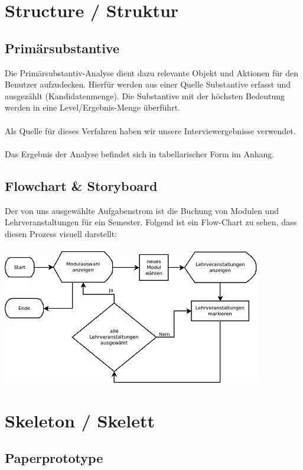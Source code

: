 \documentclass{article}
\begin{document}
\newpage

\section{Structure / Struktur}

\subsection{Primärsubstantive}

Die Primärsubstantiv-Analyse dient dazu relevante Objekt und Aktionen für den Benutzer aufzudecken. Hierfür werden aus einer Quelle Substantive erfasst und ausgezählt (Kandidatenmenge). Die Substantive mit der höchsten Bedeutung werden in eine Level/Ergebnis-Menge überführt.\\
\\
Als Quelle für dieses Verfahren haben wir unsere Interviewergebnisse verwendet.\\
\\
Das Ergebnis der Analyse befindet sich in tabellarischer Form im Anhang.

\subsection{Flowchart \& Storyboard}

Der von uns ausgewählte Aufgabenstrom ist die Buchung von Modulen und Lehrveranstaltungen für ein Semester. Folgend ist ein Flow-Chart zu sehen, dass diesen Prozess visuell darstellt:\\
\\
\includegraphics{img/flowchart.jpg}
\newpage

\section{Skeleton / Skelett}

\subsection{Paperprototype}
\end{document}
